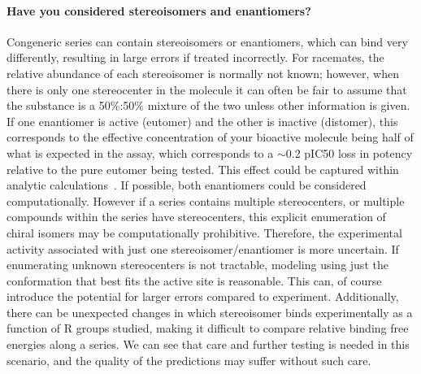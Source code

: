 \documentclass[9pt,bestpractices]{livecoms}
\begin{document}
\paragraph{Have you considered stereoisomers and enantiomers?}
Congeneric series can contain stereoisomers or enantiomers, which can bind very differently, resulting in large errors if treated incorrectly. For racemates, the relative abundance of each stereoisomer is normally not known; however, when there is only one stereocenter in the molecule it can often be fair to assume that the substance is a 50\%:50\% mixture of the two unless other information is given. If one enantiomer is active (eutomer) and the other is inactive (distomer), this corresponds to the effective concentration of your bioactive molecule being half of what is expected in the assay, which corresponds to a $\sim$0.2 pIC50 loss in potency relative to the pure eutomer being tested. This effect could be captured within analytic calculations~\cite{h2011significance}. If possible, both enantiomers could be considered computationally. However if a series contains multiple stereocenters, or multiple compounds within the series have stereocenters, this explicit enumeration of chiral isomers may be computationally prohibitive. Therefore, the experimental activity associated with just one stereoisomer/enantiomer is more uncertain. If enumerating unknown stereocenters is not tractable, modeling using just the conformation that best fits the active site is reasonable.  This can, of course introduce the potential for larger errors compared to experiment. Additionally, there can be unexpected changes in which stereoisomer binds experimentally as a function of R groups studied, making it difficult to compare relative binding free energies along a series. We can see that care and further testing is needed in this scenario, and the quality of the predictions may suffer without such care. 
\end{document}

